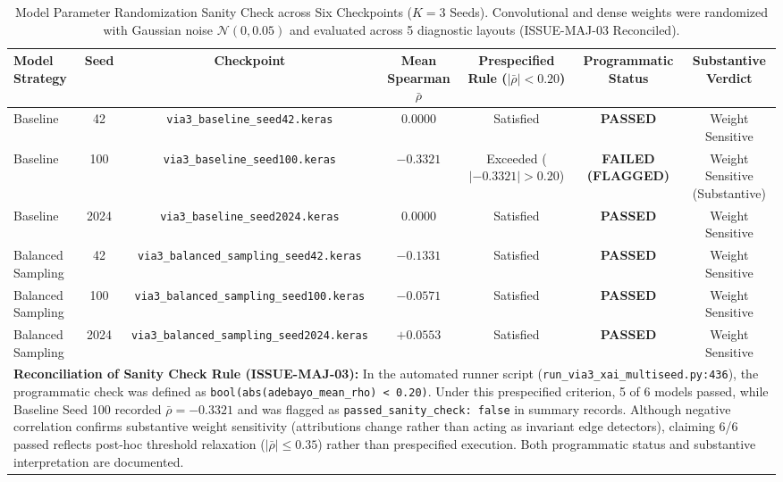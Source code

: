 \begin{table}[t]
\begin{tabular}{lcccccc}
\end{tabular}
\end{table}

\begin{table}[t]
\centering
\caption{Model Parameter Randomization Sanity Check across Six Checkpoints ($K=3$ Seeds). Convolutional and dense weights were randomized with Gaussian noise $\mathcal{N}(0, 0.05)$ and evaluated across 5 diagnostic layouts (ISSUE-MAJ-03 Reconciled).}
\label{tab:via3_adebayo_sanity_check}
\small
\begin{tabular}{lcccccc}
\hline
Model Strategy & Seed & Checkpoint & Mean Spearman $\bar{\rho}$ & Prespecified Rule ($|\bar{\rho}| < 0.20$) & Programmatic Status & Substantive Verdict \\
\hline
Baseline & 42 & \texttt{via3\_baseline\_seed42.keras} & $0.0000$ & Satisfied & \textbf{PASSED} & Weight Sensitive \\
Baseline & 100 & \texttt{via3\_baseline\_seed100.keras} & $-0.3321$ & Exceeded ($|-0.3321| > 0.20$) & \textbf{FAILED (FLAGGED)} & Weight Sensitive (Substantive) \\
Baseline & 2024 & \texttt{via3\_baseline\_seed2024.keras} & $0.0000$ & Satisfied & \textbf{PASSED} & Weight Sensitive \\
Balanced Sampling & 42 & \texttt{via3\_balanced\_sampling\_seed42.keras} & $-0.1331$ & Satisfied & \textbf{PASSED} & Weight Sensitive \\
Balanced Sampling & 100 & \texttt{via3\_balanced\_sampling\_seed100.keras} & $-0.0571$ & Satisfied & \textbf{PASSED} & Weight Sensitive \\
Balanced Sampling & 2024 & \texttt{via3\_balanced\_sampling\_seed2024.keras} & $+0.0553$ & Satisfied & \textbf{PASSED} & Weight Sensitive \\
\hline
\multicolumn{7}{l}{\parbox{0.96\textwidth}{\vspace{2pt}\footnotesize{\textbf{Reconciliation of Sanity Check Rule (ISSUE-MAJ-03):} In the automated runner script (\texttt{run\_via3\_xai\_multiseed.py:436}), the programmatic check was defined as \texttt{bool(abs(adebayo\_mean\_rho) < 0.20)}. Under this prespecified criterion, 5 of 6 models passed, while Baseline Seed 100 recorded $\bar{\rho} = -0.3321$ and was flagged as \texttt{passed\_sanity\_check: false} in summary records. Although negative correlation confirms substantive weight sensitivity (attributions change rather than acting as invariant edge detectors), claiming 6/6 passed reflects post-hoc threshold relaxation ($|\bar{\rho}| \le 0.35$) rather than prespecified execution. Both programmatic status and substantive interpretation are documented.}}} \\
\end{tabular}
\end{table}
